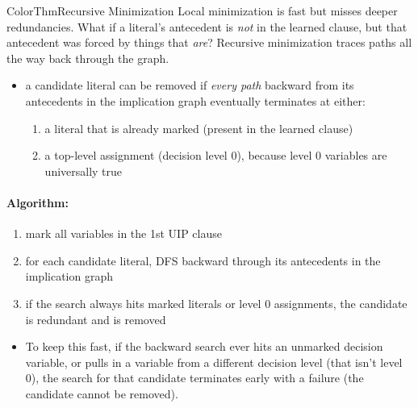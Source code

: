 \documentclass[a4paper, 11pt]{report}
\begin{document}
\begin{cframe}{ColorThm}{Recursive Minimization}
Local minimization is fast but misses deeper redundancies. What if a literal's antecedent is \textit{not} in the learned clause, but that antecedent was forced by things that \textit{are}? Recursive minimization traces paths all the way back through the graph.

\begin{itemize}
    \item a candidate literal can be removed if \textit{every path} backward from its antecedents in the implication graph eventually terminates at either:
    \begin{enumerate}
        \item a literal that is already marked (present in the learned clause)
        \item a top-level assignment (decision level 0), because level 0 variables are universally true
    \end{enumerate}
\end{itemize}

    \vspace{-1.5em}
\paragraph{Algorithm:}
    \begin{enumerate}
\vspace{-1em}
        \item mark all variables in the 1st UIP clause
        \item for each candidate literal, DFS backward through its antecedents in the implication graph
        \item if the search always hits marked literals or level 0 assignments, the candidate is redundant and is removed
    \end{enumerate}
\begin{itemize}
    \item To keep this fast, if the backward search ever hits an unmarked decision variable, or pulls in a variable from a different decision level (that isn't level 0), the search for that candidate terminates early with a failure (the candidate cannot be removed).
\end{itemize}
\end{cframe}
\end{document}
